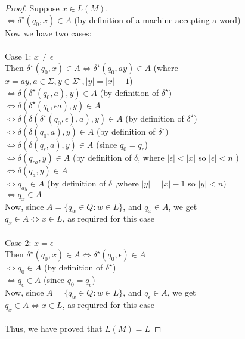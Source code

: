 \documentclass{article}
\begin{document}
\begin{proof} Suppose $x \in L(M)$. \\ 
$\Leftrightarrow \delta^\star(q_0, x) \in A$ (by definition of a machine accepting a word)\\ 
Now we have two cases:\\ \\
Case 1: $x \neq \epsilon$\\
Then $\delta^\star(q_0, x) \in A \Leftrightarrow \delta^\star(q_0, ay) \in A$ (where $x = ay, a \in \Sigma, y \in \Sigma^\star, |y| = |x|-1$)\\
$\Leftrightarrow \delta(\delta^\star(q_0, a), y) \in A$ (by definition of $\delta^\star)$\\
$\Leftrightarrow \delta(\delta^\star(q_0, \epsilon a), y) \in A$\\
$\Leftrightarrow \delta(\delta(\delta^\star(q_0, \epsilon), a), y) \in A$ (by definition of $\delta^\star$)\\
$\Leftrightarrow \delta(\delta(q_0, a), y) \in A$ (by definition of $\delta^\star)$\\
$\Leftrightarrow \delta(\delta(q_\epsilon, a), y) \in A$ (since $q_0 = q_\epsilon$)\\
$\Leftrightarrow \delta(q_{\epsilon a}, y) \in A$ (by definition of $\delta$, where $|\epsilon| < |x|$ so $|\epsilon| < n$ ) \\
$\Leftrightarrow \delta(q_{a}, y) \in A$ \\
$\Leftrightarrow q_{ay} \in A$ (by definition of $\delta$ ,where $|y| = |x|-1$ so $|y| < n)$ \\
$\Leftrightarrow q_x \in A$ \\
Now, since $A = \{q_w \in Q: w \in L\}$, and $q_x \in A$, we get\\ 
$q_x \in A \Leftrightarrow x \in L$, as required for this case\\ \\
Case 2: $x = \epsilon$\\
Then $\delta^\star(q_0, x) \in A \Leftrightarrow \delta^\star(q_0, \epsilon) \in A$\\
$\Leftrightarrow q_0 \in A$ (by definition of $\delta^\star$)\\
$\Leftrightarrow q_\epsilon \in A$ (since $q_0 = q_\epsilon$)\\
Now, since $A = \{q_w \in Q: w \in L\}$, and $q_\epsilon \in A$, we get\\
$q_x \in A \Leftrightarrow x \in L$, as required for this case\\ \\
Thus, we have proved that $L(M) = L$

\end{proof}
\end{document}
